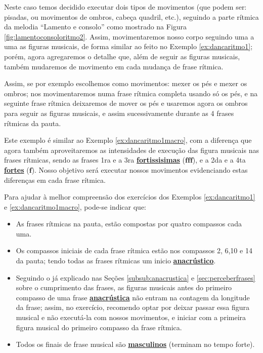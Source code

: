 \begin{example}
\label{ex:dancaritmo1macro}
Neste caso temos decidido executar dois tipos de movimentos 
(que podem ser: pisadas, ou movimentos de ombros, cabeça quadril, etc.),
seguindo a parte rítmica da melodia ``Lamento e consolo'' como mostrado na Figura \ref{fig:lamentoconsoloritmo2}.
Assim, movimentaremos nosso corpo seguindo uma a uma as figuras musicais, 
de forma similar ao feito no Exemplo \ref{ex:dancaritmo1}; porém, 
agora  agregaremos o detalhe que, além de seguir as figuras musicais,
também mudaremos de movimento em cada mudança de frase rítmica.

Assim, se por exemplo escolhemos como movimentos:
mexer os pés e mexer os ombros; nos movimentaremos numa frase rítmica completa usando só os pés,
e na seguinte frase rítmica deixaremos de mover os pés e 
usaremos agora os ombros para seguir as figuras musicais,
e assim sucessivamente durante as 4 frases rítmicas da pauta. 
\end{example}
\begin{example}
\label{ex:dancaritmo2macro}
Este exemplo é similar ao Exemplo \ref{ex:dancaritmo1macro}, 
com a diferença que agora também aproveitaremos as intensidades de execução das figura musicais nas frases rítmicas,
sendo as frases 1ra e a 3ra \hyperref[sec:sinaisintensidade]{\textbf{fortissisimas}} ($\mathbf{fff}$), 
e a 2da e a 4ta \hyperref[sec:sinaisintensidade]{\textbf{fortes}} ($\mathbf{f}$).
Nosso objetivo será executar nossos movimentos evidenciando estas diferenças em cada frase rítmica.
\end{example}
\begin{tcbattention}
Para ajudar à melhor compreensão dos exercícios dos Exemplos \ref{ex:dancaritmo1} e \ref{ex:dancaritmo1macro}, 
pode-se indicar que: 
\begin{itemize}
\item As frases rítmicas na pauta, 
estão compostas  por quatro compassos cada uma.
\item Os compassos iniciais de cada frase rítmica
estão nos compassos 2, 6,10 e 14 da pauta; tendo todas as frases rítmicas um inicio 
\hyperref[subsub:anacrustica]{\textbf{anacrústico}}.
\item Seguindo o já explicado nas Seções \ref{subsub:anacrustica} e \ref{sec:perceberfrases} 
sobre o cumprimento das frases, 
as figuras musicais antes do primeiro compasso de uma frase 
\hyperref[subsub:anacrustica]{\textbf{anacrústica}} não entram na contagem da longitude da frase;
assim, no exercício, recomendo optar por deixar passar essa figura musical e não executá-la com nossos movimentos,
e iniciar com a primeira figura musical do primeiro compasso da frase rítmica.
\item Todos os finais de frase musical são \hyperref[subsec:finaldefrasemus1]{\textbf{masculinos}}
(terminam no tempo forte).
\end{itemize}
\end{tcbattention}


